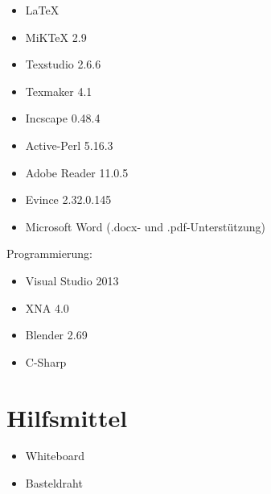 \begin{itemize}

\item LaTeX

\item MiKTeX 2.9
\item Texstudio 2.6.6
\item Texmaker 4.1
\item Incscape 0.48.4 
\item Active-Perl 5.16.3
\item Adobe Reader 11.0.5
\item Evince 2.32.0.145

\item Microsoft Word (.docx- und .pdf-Unterstützung)

\end{itemize}

Programmierung:

\begin{itemize}

\item Visual Studio 2013
\item XNA 4.0
\item Blender 2.69

\item C-Sharp

\end{itemize}


\section{Hilfsmittel}

\begin{itemize}

\item Whiteboard
\item Basteldraht 

\end{itemize}



%
%
%
%
%
%
%
%
%
%
%
%
